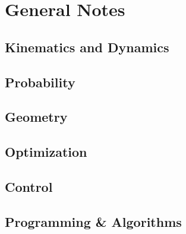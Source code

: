 \chapter{General Notes}

\section{Kinematics and Dynamics}
\section{Probability}
\section{Geometry}
\section{Optimization}
\section{Control}
\section{Programming \& Algorithms}